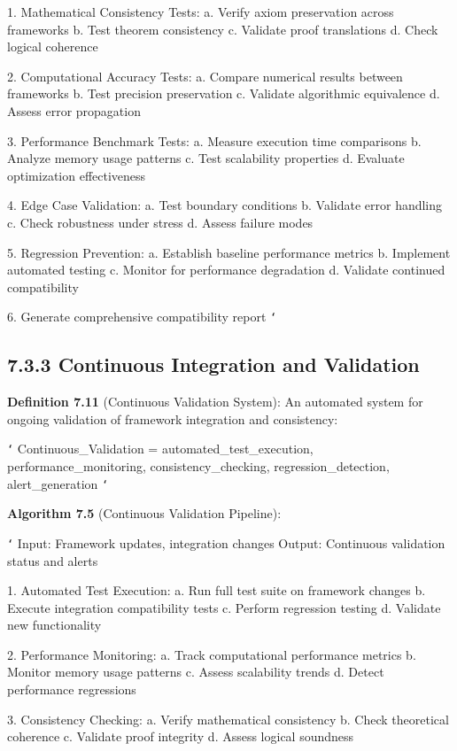 1. Mathematical Consistency Tests:
   a. Verify axiom preservation across frameworks
   b. Test theorem consistency
   c. Validate proof translations
   d. Check logical coherence
   
2. Computational Accuracy Tests:
   a. Compare numerical results between frameworks
   b. Test precision preservation
   c. Validate algorithmic equivalence
   d. Assess error propagation
   
3. Performance Benchmark Tests:
   a. Measure execution time comparisons
   b. Analyze memory usage patterns
   c. Test scalability properties
   d. Evaluate optimization effectiveness
   
4. Edge Case Validation:
   a. Test boundary conditions
   b. Validate error handling
   c. Check robustness under stress
   d. Assess failure modes
   
5. Regression Prevention:
   a. Establish baseline performance metrics
   b. Implement automated testing
   c. Monitor for performance degradation
   d. Validate continued compatibility
   
6. Generate comprehensive compatibility report
\texttt{`}

\subsection{7.3.3 Continuous Integration and Validation}

\textbf{Definition 7.11} (Continuous Validation System): An automated system for ongoing validation of framework integration and consistency:

\texttt{`}
Continuous_Validation = {
    automated_test_execution,
    performance_monitoring,
    consistency_checking,
    regression_detection,
    alert_generation
}
\texttt{`}

\textbf{Algorithm 7.5} (Continuous Validation Pipeline):

\texttt{`}
Input: Framework updates, integration changes
Output: Continuous validation status and alerts

1. Automated Test Execution:
   a. Run full test suite on framework changes
   b. Execute integration compatibility tests
   c. Perform regression testing
   d. Validate new functionality
   
2. Performance Monitoring:
   a. Track computational performance metrics
   b. Monitor memory usage patterns
   c. Assess scalability trends
   d. Detect performance regressions
   
3. Consistency Checking:
   a. Verify mathematical consistency
   b. Check theoretical coherence
   c. Validate proof integrity
   d. Assess logical soundness
   
